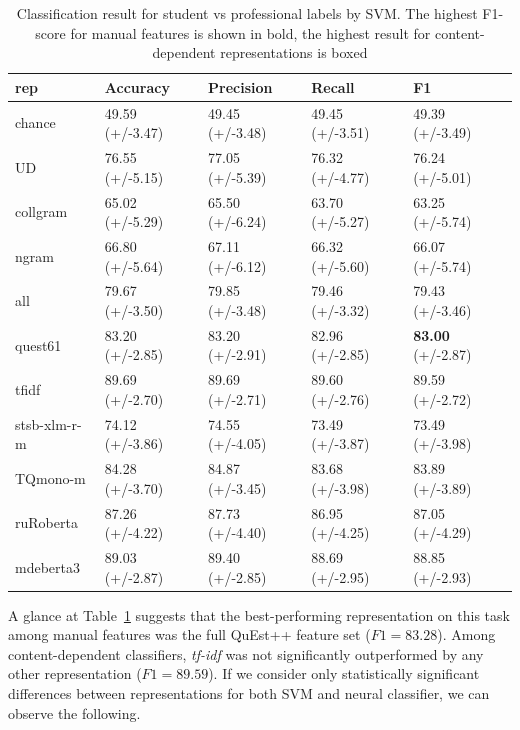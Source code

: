 \begin{table}[H]
	\centering
	\begin{tabular}{l|llll}
		\toprule
		rep   & Accuracy        & Precision       & Recall          & F1              \\
		\midrule
		chance          & 49.59 (+/-3.47) & 49.45 (+/-3.48) & 49.45 (+/-3.51) & 49.39 (+/-3.49) \\
		\midrule
		UD              & 76.55 (+/-5.15) & 77.05 (+/-5.39) & 76.32 (+/-4.77) & 76.24 (+/-5.01) \\
		collgram        & 65.02 (+/-5.29) & 65.50 (+/-6.24) & 63.70 (+/-5.27) & 63.25 (+/-5.74) \\
		ngram           & 66.80 (+/-5.64) & 67.11 (+/-6.12) & 66.32 (+/-5.60) & 66.07 (+/-5.74) \\
		all             & 79.67 (+/-3.50) & 79.85 (+/-3.48) & 79.46 (+/-3.32) & 79.43 (+/-3.46) \\
		\midrule
		quest61         & 83.20 (+/-2.85) & 83.20 (+/-2.91) & 82.96 (+/-2.85) & \textbf{83.00} (+/-2.87) \\
		\midrule
		tfidf           & 89.69 (+/-2.70) & 89.69 (+/-2.71) & 89.60 (+/-2.76) & \boxit{0.4in} 89.59 (+/-2.72) \\
		stsb-xlm-r-m          & 74.12 (+/-3.86) & 74.55 (+/-4.05) & 73.49 (+/-3.87) & 73.49 (+/-3.98) \\
		TQmono-m        & 84.28 (+/-3.70) & 84.87 (+/-3.45) & 83.68 (+/-3.98) & 83.89 (+/-3.89) \\
		ruRoberta & 87.26 (+/-4.22) & 87.73 (+/-4.40) & 86.95 (+/-4.25) & 87.05 (+/-4.29) \\
		mdeberta3  & 89.03 (+/-2.87) & 89.40 (+/-2.85) & 88.69 (+/-2.95) & 88.85 (+/-2.93)\\
		\bottomrule
	\end{tabular}
	\caption{\label{tab:stu-pro}Classification result for student vs professional labels by SVM. The highest F1-score for manual features is shown in bold, the highest result for content-dependent representations is boxed}
\end{table}

A glance at Table~\ref{tab:stu-pro} suggests that the best-performing representation on this task among manual features was the full QuEst++ feature set ($F1=83.28$). Among content-dependent classifiers, \textit{tf-idf} was not significantly outperformed by any other representation ($F1=89.59$). If we consider only statistically significant differences between representations for both SVM and neural classifier, we can observe the following. 

